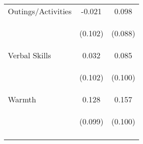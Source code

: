 \begin{tabular}{lcc}
\noalign{\smallskip}Outings/Activities & -0.021 & 0.098\\
 & \begin{footnotesize}(0.102)\end{footnotesize} & \begin{footnotesize}(0.088)\end{footnotesize}\\
\noalign{\smallskip}Verbal Skills & 0.032 & 0.085\\
 & \begin{footnotesize}(0.102)\end{footnotesize} & \begin{footnotesize}(0.100)\end{footnotesize}\\
\noalign{\smallskip}Warmth & 0.128 & 0.157\\
 & \begin{footnotesize}(0.099)\end{footnotesize} & \begin{footnotesize}(0.100)\end{footnotesize}\\
\noalign{\smallskip}\hline\end{tabular}\\

